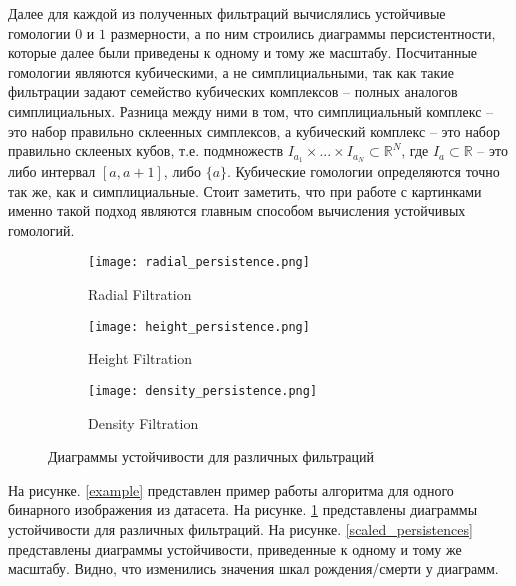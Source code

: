 Далее для каждой из полученных фильтраций вычислялись устойчивые гомологии $0$ и $1$ размерности, а по ним строились диаграммы персистентности, которые далее были приведены к одному и тому же масштабу. Посчитанные гомологии являются кубическими, а не симплициальными, так как такие фильтрации задают семейство кубических комплексов -- полных аналогов симплициальных. Разница между ними в том, что симплициальный комплекс -- это набор правильно склеенных симплексов, а кубический комплекс -- это набор правильно склееных кубов, т.е. подмножеств $I_{a_1} \times ... \times I_{a_N} \subset \mathbb{R}^N$, где $I_a \subset \mathbb{R}$ -- это либо интервал $[a, a+1]$, либо $\{a\}$. Кубические гомологии определяются точно так же, как и симплициальные. Стоит заметить, что при работе с картинками именно такой подход являются главным способом вычисления устойчивых гомологий.

\begin{figure}[!htbp]
	\begin{subfigure}{.33\textwidth}
		\centering
		\texttt{[image: radial\_persistence.png]}\\
		\caption{Radial Filtration}
	\end{subfigure}%
	\begin{subfigure}{.33\textwidth}
		\centering
		\texttt{[image: height\_persistence.png]}\\
		\caption{Height Filtration}
	\end{subfigure}%
	\begin{subfigure}{.33\textwidth}
		\centering
		\texttt{[image: density\_persistence.png]}\\
		\caption{Density Filtration}
	\end{subfigure}%
	\caption{Диаграммы устойчивости для различных фильтраций}
	\label{persistences}
\end{figure}

 На рисунке. \ref{example} представлен пример работы алгоритма для одного бинарного изображения из датасета. На рисунке. \ref{persistences} представлены диаграммы устойчивости для различных фильтраций. На рисунке. \ref{scaled_persistences} представлены диаграммы устойчивости, приведенные к одному и тому же масштабу. Видно, что изменились значения шкал рождения/смерти у диаграмм.


